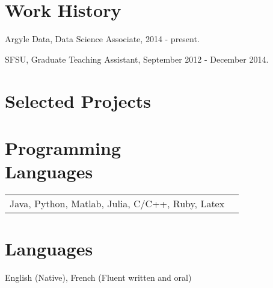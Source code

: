 \documentclass[margin,line,pifont,palatino,courier]{res}
\newenvironment{list1}{
  \begin{list}{\label{}}{%
      \setlength{\itemsep}{0in}
      \setlength{\parsep}{0in} \setlength{\parskip}{0in}
      \setlength{\topsep}{0in} \setlength{\partopsep}{0in}
      \setlength{\leftmargin}{0.0in}}}{\end{list}}
\begin{document}
\begin{resume}



\section{\sc  Work History}

\begin{list1}
 \item Argyle Data, Data Science Associate, 2014 - present.
 \item SFSU, Graduate Teaching Assistant, September 2012 - December 2014.
\end{list1}



\section{\sc  Selected Projects}



\section{\sc Programming\\ Languages}

\begin{tabular}{@{}p{6in}p{3in}}

Java, Python, Matlab, Julia,  C/C++, Ruby, Latex \\


\end{tabular}



\section{\sc  Languages}
  English (Native), French (Fluent written and oral)



\end{resume}
\end{document}
